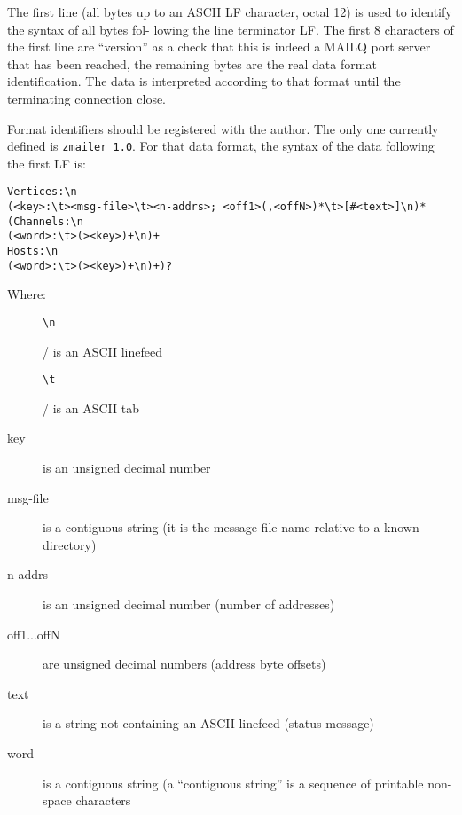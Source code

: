 The first line (all bytes up to an ASCII LF character,
octal 12) is used to identify the syntax of all bytes fol-
lowing the line terminator LF.  The first 8 characters  of
the first line are ``version'' as a check that this is
indeed a MAILQ port server that has been reached, the
remaining  bytes are the real data format identification.
The data is interpreted according to that format until the
terminating connection close.

Format identifiers should be registered with the author.
The only one currently defined is {\tt zmailer 1.0}. For that
data format, the syntax of the data following the first LF
is:
\begin{tscreen}
\begin{verbatim}
Vertices:\n
(<key>:\t><msg-file>\t><n-addrs>; <off1>(,<offN>)*\t>[#<text>]\n)*
(Channels:\n
(<word>:\t>(><key>)+\n)+
Hosts:\n
(<word>:\t>(><key>)+\n)+)?
\end{verbatim}
\end{tscreen}

Where:
\begin{description}
\item[] \mbox{}

\begin{verbatim}
\n
\end{verbatim}
/ is an ASCII linefeed

\item[] \mbox{}

\begin{verbatim}
\t
\end{verbatim}
/ is an ASCII tab

\item[key] \mbox{}

is an unsigned decimal number

\item[msg-file] \mbox{}

is a contiguous string (it is the message file name relative 
to a known directory)

\item[n-addrs] \mbox{}

is an unsigned decimal number (number of addresses)

\item[off1...offN] \mbox{}

are unsigned decimal numbers (address byte offsets)

\item[text] \mbox{}

is a string not containing an ASCII linefeed (status message)

\item[word] \mbox{}

is a contiguous string (a ``contiguous string'' is a sequence of 
printable non-space characters

\end{description}

